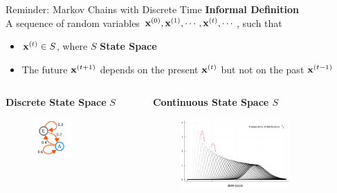\documentclass[aspectratio=169, 9pt]{beamer}
\theoremstyle{definition}
\begin{document}
\begin{frame}{Reminder: Markov Chains with Discrete Time}
\textbf{Informal Definition}\\ 
A sequence of random variables $\mathbf{x}^{(0)},\mathbf{x}^{(1)},\cdots,\mathbf{x}^{(t)},\cdots$,
such that
\begin{itemize}
  \item $\mathbf{x}^{(t)}\in S$, where $S$ \textbf{State Space}
  \item The future $\mathbf{x}^{(t+1)}$ depends on the present $\mathbf{x}^{(t)}$ 
    but not on the past $\mathbf{x}^{(t-1)}$
\end{itemize}
  \vfill
\begin{columns}
  \begin{column}{0.5\textwidth}
    \begin{center}
      \textbf{Discrete State Space} $S$
    \end{center}
    \begin{figure}[h!]
      \centering
      \includegraphics[width=0.5\textwidth, trim=0 0 0
      3cm]{./pic/markov_chain_discrete space.png}\
    \end{figure}
  \end{column}
  \begin{column}{0.5\textwidth}
    \begin{center}
      \textbf{Continuous State Space $S$}
      \begin{figure}[h!]
      \centering
      \includegraphics[width=0.75\textwidth, trim=0 0 0 2cm]{./pic/markov_chain_continous space2.png}
    \end{figure}
    \end{center}
  \end{column}
\end{columns}
\end{frame}
\end{document}
